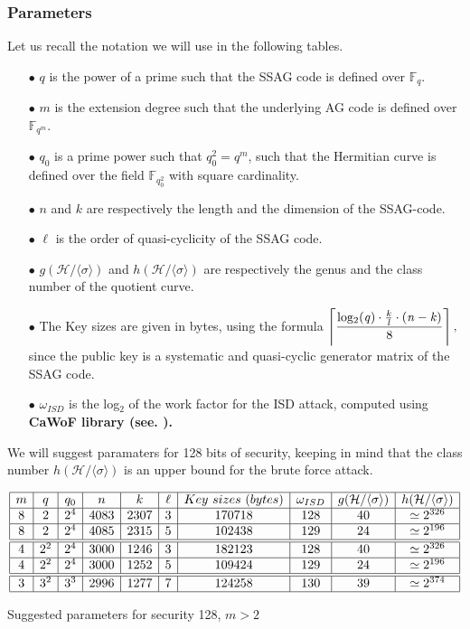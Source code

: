\documentclass[10pt]{article}
\newcommand{\s}{\vspace{0.3cm}}
\newcommand{\cd}{\cdot}
\newcommand{\calH}{\mathcal{H}}
\newcommand{\fqm}{\mathbb{F}_{q^m}}
\newcommand{\fq}{\mathbb{F}_q}
\newcommand{\w}{\omega}
\begin{document}
 \subsubsection{Parameters} 

\s

Let us recall the notation we will use in the following tables.

\begin{enumerate}
\item[$\bullet$] $q$ is the power of a prime such that the SSAG code is defined over $\fq$.
\item[$\bullet$] $m$ is the extension degree such that the underlying AG code is defined over $\fqm$.
\item[$\bullet$] $q_0$ is a prime power such that $q_0^2=q^m$, such that the Hermitian curve is defined over the field $\mathbb{F}_{q_0^2}$ with square cardinality.
\item[$\bullet$] $n$ and $k$ are respectively the length and the dimension of the SSAG-code.
\item[$\bullet$] $\ell$ is the order of quasi-cyclicity of the SSAG code.  
\item[$\bullet$] $g(\calH/\langle \sigma \rangle)$ and $h(\calH/\langle \sigma \rangle)$ are respectively the genus and the class number of the quotient curve.
\item[$\bullet$] The Key sizes are given in bytes, using the formula $\left\lceil \dfrac{\rm log_{2}\it (q) \cd \frac{k}{l} \cd (n-k)}{8} \right\rceil,$ since the public key is a systematic and quasi-cyclic generator matrix of the SSAG code.
\item[$\bullet$] $\w_{ISD}$ is the log$_2$ of the work factor for the ISD attack, computed using \bf{CaWoF} \rm library (see. \cite{CAWOF}).
\end{enumerate}
We will suggest paramaters for 128 bits of security, keeping in mind that the class number $h(\calH/\langle \sigma \rangle)$ is an upper bound for the brute force attack. 

\s

\begin{table}[htbp]
\begin{equation*}
\begin{array}{|c|c|c|c|c|c|c|c|c|c|}
\hline
m & q & q_0 & n & k & \ell & Key \ sizes \ (bytes) & \w_{ISD} & g(\calH/\langle \sigma \rangle) & h(\calH/\langle \sigma \rangle) \\
\hline
8 & 2 & 2^4 & 4083 & 2307 & 3 & 170718 & 128 & 40 & \simeq 2^{326} \\
\hline
8 & 2 & 2^4 & 4085 & 2315 & 5 & 102438 & 129 & 24 & \simeq 2^{196} \\
\hline \hline
4 & 2^2 & 2^4 & 3000 & 1246 & 3 & 182123 & 128 & 40 & \simeq 2^{326} \\
\hline
4 & 2^2 & 2^4 & 3000 & 1252 & 5 & 109424 & 129 & 24 & \simeq 2^{196} \\
\hline \hline
3 & 3^2 & 3^3 & 2996 & 1277 & 7 & 124258 & 130 & 39 & \simeq 2^{374} \\
\hline
\end{array}
\end{equation*}
\caption{Suggested parameters for security 128, $m > 2$}
\end{table}
\end{document}
